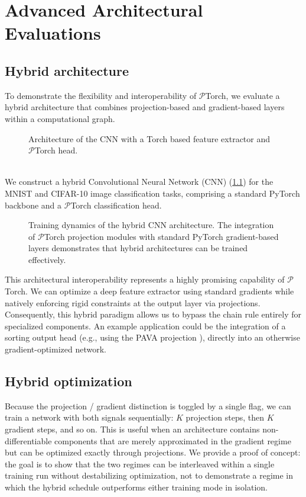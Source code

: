 
\chapter{Advanced Architectural Evaluations}
\label{cha:Advanced}
\section{Hybrid architecture}
To demonstrate the flexibility and interoperability of $\mathcal{P}$Torch, we evaluate a hybrid architecture that combines projection-based and gradient-based layers within a computational graph.
\begin{figure}[ht]
\centering
\resizebox{\textwidth}{!}{}
\caption{Architecture of the CNN with a Torch based feature extractor and $\mathcal{P}$Torch head.}
\label{fig:hybrid-architecture}
\end{figure}
\begin{tcolorbox}[reprocard, title=Setup]\\
We construct a hybrid Convolutional Neural Network (CNN) (\cref{fig:hybrid-architecture}) for the MNIST and CIFAR-10 image classification tasks, comprising a standard PyTorch backbone and a  $\mathcal{P}$Torch classification head. 
\end{tcolorbox}

\begin{figure}[ht]
\centering
{}
\caption{Training dynamics of the hybrid CNN architecture. The integration of
$\mathcal{P}$Torch projection modules with standard PyTorch
gradient-based layers demonstrates that hybrid architectures can be trained
effectively.}
\label{fig:hybrid-cnn}
\end{figure}
This architectural interoperability represents a highly promising capability of $\mathcal{P}$Torch. We can optimize a deep feature extractor using standard gradients while natively enforcing rigid constraints at the output layer via projections. Consequently, this hybrid paradigm allows us to bypass the chain rule entirely for specialized components. An example application could be the integration of a sorting output head (e.g., using the PAVA projection \cite{best1990active}), directly into an otherwise gradient-optimized network.

\section{Hybrid optimization}
  Because the projection / gradient distinction is toggled by a single flag, we can train a network with both signals sequentially: $K$
  projection steps, then $K$ gradient steps, and so on. This is useful when an architecture contains non-differentiable components that are
  merely approximated in the gradient regime but can be optimized exactly through projections. We provide a proof of
  concept: the goal is to show that the two regimes can be interleaved within a single training run without destabilizing optimization, not
  to demonstrate a regime in which the hybrid schedule outperforms either training mode in isolation.

